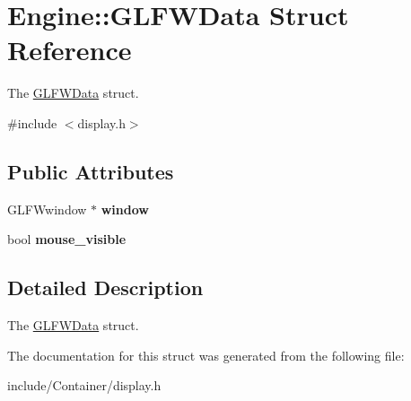 \hypertarget{structEngine_1_1GLFWData}{}\section{Engine\+:\+:G\+L\+F\+W\+Data Struct Reference}
\label{structEngine_1_1GLFWData}


The \hyperlink{structEngine_1_1GLFWData}{G\+L\+F\+W\+Data} struct.  




{\ttfamily \#include $<$display.\+h$>$}

\subsection*{Public Attributes}
\begin{DoxyCompactItemize}
\item 
\hypertarget{structEngine_1_1GLFWData_aff9f44d9e271c5a755ff9cdec7de5630}{}G\+L\+F\+Wwindow $\ast$ {\bfseries window}\label{structEngine_1_1GLFWData_aff9f44d9e271c5a755ff9cdec7de5630}

\item 
\hypertarget{structEngine_1_1GLFWData_acbc36b766597db26d5c1536fc8f13575}{}bool {\bfseries mouse\+\_\+visible}\label{structEngine_1_1GLFWData_acbc36b766597db26d5c1536fc8f13575}

\end{DoxyCompactItemize}


\subsection{Detailed Description}
The \hyperlink{structEngine_1_1GLFWData}{G\+L\+F\+W\+Data} struct. 

The documentation for this struct was generated from the following file\+:\begin{DoxyCompactItemize}
\item 
include/\+Container/display.\+h\end{DoxyCompactItemize}

